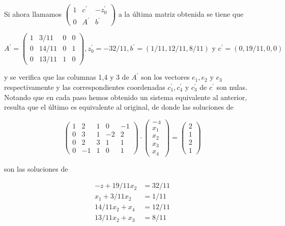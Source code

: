\documentclass[10pt]{article}
\begin{document}
Si ahora llamamos $\left(\begin{array}{cc|c}1 & c^{\prime} & -z_{0}^{\prime} \\ 0 & A^{\prime} & b^{\prime}\end{array}\right)$ a la última matriz obtenida se tiene que

$$
A^{\prime}=\left(\begin{array}{cccc}
1 & 3 / 11 & 0 & 0 \\
0 & 14 / 11 & 0 & 1 \\
0 & 13 / 11 & 1 & 0
\end{array}\right), z_{0}^{\prime}=-32 / 11, b^{\prime}=(1 / 11,12 / 11,8 / 11) \text { y } c^{\prime}=(0,19 / 11,0,0)
$$

y se verifica que las columnas 1,4 y 3 de $A^{\prime}$ son los vectores $e_{1}, e_{2}$ y $e_{3}$ respectivamente y las correspondientes coordenadas $c_{1}^{\prime}, c_{4}^{\prime}$ y $c_{3}^{\prime}$ de $c^{\prime}$ son nulas.\\
Notando que en cada paso hemos obtenido un sistema equivalente al anterior, resulta que el último es equivalente al original, de donde las soluciones de

$$
\left(\begin{array}{ccccc}
1 & 2 & 1 & 0 & -1 \\
0 & 3 & 1 & -2 & 2 \\
0 & 2 & 3 & 1 & 1 \\
0 & -1 & 1 & 0 & 1
\end{array}\right) \cdot\left(\begin{array}{c}
-z \\
x_{1} \\
x_{2} \\
x_{3} \\
x_{4}
\end{array}\right)=\left(\begin{array}{c}
2 \\
1 \\
2 \\
1
\end{array}\right)
$$

son las soluciones de

$$
\begin{aligned}
-z+19 / 11 x_{2} & =32 / 11 \\
x_{1}+3 / 11 x_{2} & =1 / 11 \\
14 / 11 x_{2}+x_{4} & =12 / 11 \\
13 / 11 x_{2}+x_{3} & =8 / 11
\end{aligned}
$$
\end{document}
